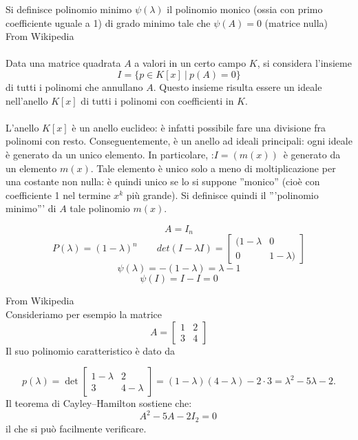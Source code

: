 \begin{defn}
Si definisce polinomio minimo $\psi(\lambda)$ il polinomio monico 
(ossia con primo coefficiente uguale a 1) di grado minimo tale che
 $\psi(A) = 0$ (matrice nulla)
\\ From Wikipedia\\ \\
Data una matrice quadrata $A$ a valori in un certo campo $K$, si considera
l'insieme $$ I = \{p\in K[x]\ |\ p(A) = 0\} $$
di tutti i polinomi che annullano $A$. Questo insieme risulta essere
un ideale nell'anello $K[x]$ di tutti i polinomi con coefficienti in $K$.
\\ \\
L'anello $K[x]$ \`e un anello euclideo: \`e infatti possibile fare una
divisione fra polinomi con resto. Conseguentemente, \`e un anello ad
ideali principali: ogni ideale \`e generato da un unico elemento. 
In particolare, :$I = (m(x))\,\!$ 
\`e generato da un elemento $m(x)$. Tale elemento \`e unico solo a meno 
di moltiplicazione per una costante non nulla: \`e quindi unico se lo si 
suppone ''monico'' (cio\`e con coefficiente 1 nel termine $x^k$ più grande).
Si definisce quindi il '''polinomio minimo''' di $A$ tale polinomio $m(x)$.
\end{defn}
\begin{example}
 $$A = I_{n} $$
 $$ P(\lambda ) = (1-\lambda)^{n} \qquad  det(I - \lambda I) = 
\left[
\begin{array}{cc}
 ( 1 - \lambda  & 0 \\
0   & 1-\lambda)
\end{array}
\right]
 $$
 $$ \psi(\lambda) = -(1 -\lambda) = \lambda -1 $$
$$ \psi(I) = I - I = 0$$           
\end{example}
\begin{example}
 From Wikipedia \\
Consideriamo per esempio la matrice 
$$A = \begin{bmatrix}1&2\\
3&4\end{bmatrix}$$
Il suo polinomio caratteristico \`e dato da

$$p(\lambda)=\det\begin{bmatrix}1-\lambda&2\\
3&4-\lambda\end{bmatrix}=(1-\lambda)(4-\lambda)- 2\cdot 3=\lambda^2-5\lambda-2.$$
Il teorema di Cayley–Hamilton sostiene che:
$$A^2-5A-2I_2=0\,\!$$
il che si può facilmente verificare.
\end{example}

